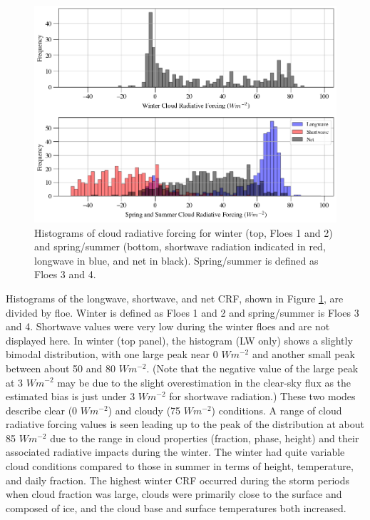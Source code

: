 \begin{figure}[t!]
    \centering
    \includegraphics[width=1\linewidth]{figures/chapter4/ForcingValues.png}
    \caption[Histograms of cloud radiative forcing by season.]{Histograms of cloud radiative forcing for winter (top, Floes 1 and 2) and spring/summer (bottom, shortwave radiation indicated in red, longwave in blue, and net in black). Spring/summer is defined as Floes 3 and 4.}
    \label{fig:crf_histo}
\end{figure}

Histograms of the longwave, shortwave, and net CRF, shown in Figure \ref{fig:crf_histo}, are divided by floe. Winter is defined as Floes 1 and 2 and spring/summer is Floes 3 and 4. Shortwave values were very low during the winter floes and are not displayed here. In winter (top panel), the histogram (LW only) shows a slightly bimodal distribution, with one large peak near 0 $W m^{-2}$ and another small peak between about 50 and 80 $W m^{-2}$. (Note that the negative value of the large peak at 3 $W m^{-2}$ may be due to the slight overestimation in the clear-sky flux as the estimated bias is just under 3 $Wm^{-2}$ for shortwave radiation.) These two modes describe clear (0 $W m^{-2}$) and cloudy (75 $W m^{-2}$) conditions. A range of cloud radiative forcing values is seen leading up to the peak of the distribution at about 85 $W m^{-2}$ due to the range in cloud properties (fraction, phase, height) and their associated radiative impacts during the winter. The winter had quite variable cloud conditions compared to those in summer in terms of height, temperature, and daily fraction. The highest winter CRF occurred during the storm periods when cloud fraction was large, clouds were primarily close to the surface and composed of ice, and the cloud base and surface temperatures both increased.  

